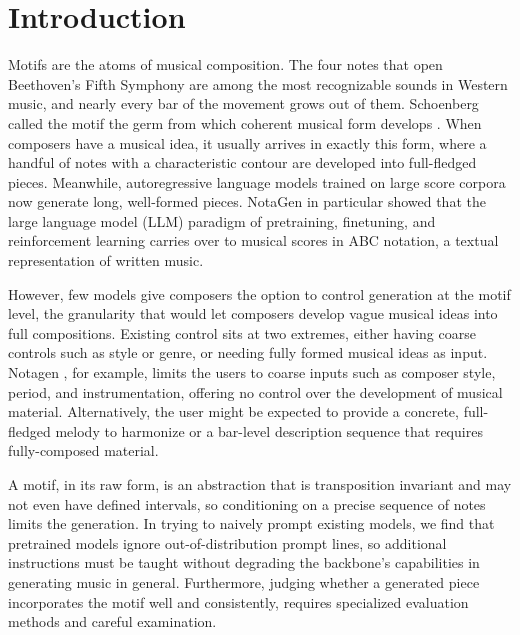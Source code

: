 \documentclass{article}
\newcommand{\cmtS}[1]{{\color{blue} (Simon: #1)}}
\begin{document}
\section{Introduction}
\label{sec:intro}

Motifs are the atoms of musical composition. The four notes that open Beethoven's Fifth Symphony are among the most recognizable sounds in Western music, and nearly every bar of the movement grows out of them. Schoenberg called the motif the germ from which coherent musical form develops \citep{schoenberg1967fundamentals}. When composers have a musical idea, it usually arrives in exactly this form, where a handful of notes with a characteristic contour are developed into full-fledged pieces. Meanwhile, autoregressive language models trained on large score corpora \citep{huang2019music, payne2019musenet, wu2023tunesformer, qu2024mupt} now generate long, well-formed pieces. NotaGen in particular \mbox{\citep{wang2025notagen}} showed that the large language model (LLM) paradigm of pretraining, finetuning, and reinforcement learning carries over to musical scores in ABC notation, a textual representation of written music.%


However, few models give composers the option to control generation at the motif level, the granularity that would let composers develop vague musical ideas into full compositions. Existing control sits at two extremes, either having coarse controls such as style or genre, or needing fully formed musical ideas as input. Notagen \citep{wang2025notagen}, for example, limits the users to coarse inputs such as composer style, period, and instrumentation, offering no control over the development of musical material. Alternatively, the user might be expected to provide a concrete, full-fledged melody\citep{yuan2024chatmusicianunderstandinggeneratingmusic} to harmonize or a bar-level description sequence \citep{vonrutte2023figaro} that requires fully-composed material.

A motif, in its raw form, is an abstraction that is transposition invariant and may not even have defined intervals, so conditioning on a precise sequence of notes limits the generation. In trying to naively prompt existing models, we find that pretrained models ignore out-of-distribution prompt lines, so additional instructions must be taught without degrading the backbone's capabilities in generating music in general. Furthermore, judging whether a generated piece incorporates the motif well and consistently, requires specialized evaluation methods and careful examination.
\end{document}
